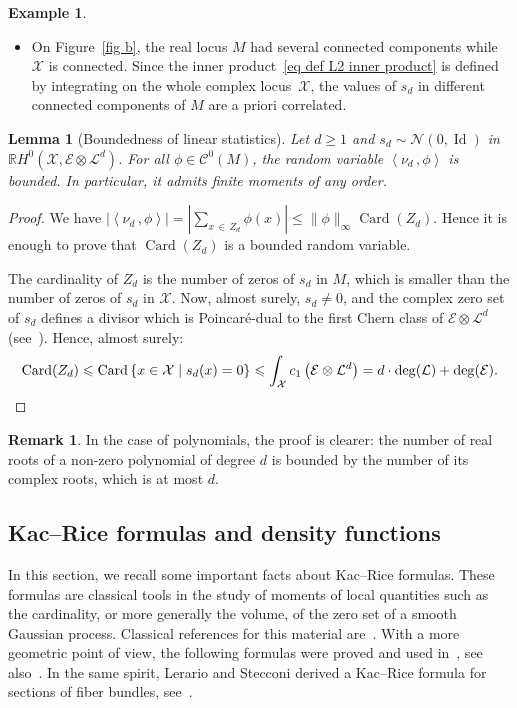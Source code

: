 \documentclass[10pt]{amsart}
\newtheorem{lemm}[theo]{Lemma}\newtheorem{prop}[theo]{Proposition}\newtheorem{coro}[theo]{Corollary}\newtheorem{conj}[theo]{Conjecture}
\theoremstyle{definition}\newtheorem{defi}[theo]{Definition}\newtheorem{rema}[theo]{Remark}\newtheorem{exam}[theo]{Example}\newtheorem{exem}[theo]{Example}\newtheorem{nota}[theo]{Notation}
\DeclareMathOperator{\card}{Card}
\DeclareMathOperator{\Id}{Id}
\newcommand{\E}{\mathcal{E}}
\newcommand{\X}{\mathcal{X}}
\renewcommand{\L}{\mathcal{L}}
\newcommand{\clN}{\mathcal{N}}
\newcommand{\clC}{\mathcal{C}}
\newcommand{\R}{\mathbb{R}}
\newcommand{\mvert}{\mathrel{}\middle|\mathrel{}}
\newcommand{\prsc}[2]{\left\langle #1\,, #2 \right\rangle}
\renewcommand{\H}{H^0(\X,\E \otimes \L^d)}
\renewcommand{\geq}{\geqslant}
\renewcommand{\leq}{\leqslant}
\begin{document}
\begin{exam}
\begin{itemize}
\item On Figure~\ref{fig b}, the real locus $M$ had several connected components while $\X$ is connected. Since the inner product~\eqref{eq def L2 inner product} is defined by integrating on the whole complex locus~$\X$, the values of $s_d$ in different connected components of $M$ are a priori correlated.
\end{itemize}
\end{exam}

\begin{lemm}[{Boundedness of linear statistics}]\label{lem L inf random variables}
Let $d \geq 1$ and $s_d \sim \clN(0,\Id)$ in $\R\H$. For all $\phi \in \clC^0(M)$, the random variable $\prsc{\nu_d}{\phi}$ is bounded. In particular, it admits finite moments of any order.
\end{lemm}

\begin{proof}
We have $|\prsc{\nu_d}{\phi}| = |\sum_{x\,\in\,Z_d}\phi(x)| \leq \|\phi\|_\infty \card(Z_d)$. Hence it is enough to prove that $\card(Z_d)$ is a bounded random variable.

The cardinality of $Z_d$ is the number of zeros of $s_d$ in $M$, which is smaller than the number of zeros of $s_d$ in $\X$. Now, almost surely, $s_d \neq 0$, and the complex zero set of $s_d$ defines a divisor which is Poincaré-dual to the first Chern class of $\E \otimes \L^d$ (see~\cite[pp.~136 and~141]{GH1994}). Hence, almost surely:
\[
\card(Z_d) \leq \card \left\{ x \in \X \mvert s_d(x)=0 \right\} \leq \int_\X c_1\left(\E \otimes \L^d\right)=d\cdot\deg(\L)+\deg(\E).\qedhere
\]
\end{proof}

\begin{rema}\label{rem roots}
In the case of polynomials, the proof is clearer: the number of real roots of a non-zero polynomial of degree $d$ is bounded by the number of its complex roots, which is at most $d$.
\end{rema}



\subsection{Kac--Rice formulas and density functions}\label{subsec Kac-Rice formulas and density functions}

In this section, we recall some important facts about Kac--Rice formulas. These formulas are classical tools in the study of moments of local quantities such as the cardinality, or more generally the volume, of the zero set of a smooth Gaussian process. Classical references for this material are~\cite{AT2007,AW2009}. With a more geometric point of view, the following formulas were proved and used in~\cite{Anc2019,GW2016,LP2019}, see also~\cite{Let2016}. In the same spirit, Lerario and Stecconi derived a Kac--Rice formula for sections of fiber bundles, see~\cite[Theorem~23, point~6]{LS2019a}.
\end{document}
